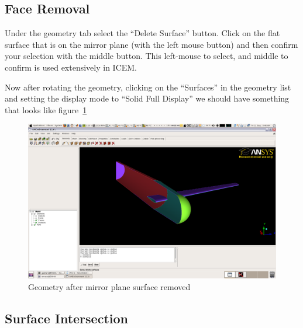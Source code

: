 \documentclass{report}
\begin{document}
\subsection{Face Removal}
Under the geometry tab select the ``Delete Surface'' button. Click on the flat surface that is on the mirror plane (with the left mouse button) and then confirm your selection with the middle button. This left-mouse to select, and middle to confirm is used extensively in ICEM.

Now after rotating the geometry, clicking on the ``Surfaces'' in the geometry list and setting the display mode to ``Solid Full Display'' we should have something that looks like figure~\ref{fig:geo_surface_removed}

\begin{figure}[htb]
  \centering
  \includegraphics[width=\textwidth,angle=0]{figures/fig2.png}
  \caption{Geometry after mirror plane surface removed}
  \label{fig:geo_surface_removed}
\end{figure}

\subsection{Surface Intersection}
\end{document}
